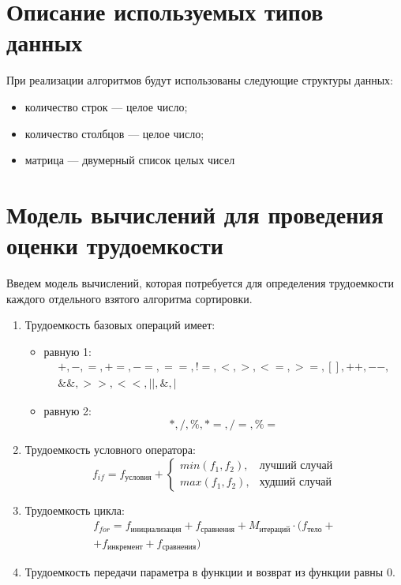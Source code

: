 \section{Описание используемых типов данных}

При реализации алгоритмов будут использованы следующие структуры данных:

\begin{itemize}
	\item количество строк --- целое число;
	\item количество столбцов --- целое число;
	\item матрица --- двумерный список целых чисел
\end{itemize}

\section{Модель вычислений для проведения оценки трудоемкости}

Введем модель вычислений, которая потребуется для определения трудоемкости каждого отдельного взятого алгоритма сортировки.
\begin{enumerate}[label={\arabic*)}]
	\item Трудоемкость базовых операций имеет:
	\begin{itemize}[label=---]
		\item равную 1:
		\begin{equation}
			\label{for:operations_1}
			\begin{gathered}
				+, -, =, +=, -=, ==, !=, <, >, <=, >=, [], ++, {-}-,\\
				\&\&, >>, <<, ||, \&, |
			\end{gathered}
		\end{equation}
		\item равную 2:
		\begin{equation}
			\label{for:operations_2}
			*, /, \%, *=, /=, \%=
		\end{equation}
	\end{itemize}
	\item Трудоемкость условного оператора:
	\begin{equation}
		\label{for:if}
		f_{if} = f_{\text{условия}} + 
		\begin{cases}
			min(f_1, f_2), & \text{лучший случай}\\
			max(f_1, f_2), & \text{худший случай}
		\end{cases}
	\end{equation}
	\item Трудоемкость цикла:
	\begin{equation}
		\label{for:for}
		\begin{gathered}
			f_{for} = f_{\text{инициализация}} + f_{\text{сравнения}} + M_{\text{итераций}} \cdot (f_{\text{тело}} +\\
			+ f_{\text{инкремент}} + f_{\text{сравнения}})
		\end{gathered}
	\end{equation}
	\item Трудоемкость передачи параметра в функции и возврат из функции равны 0.
\end{enumerate}

